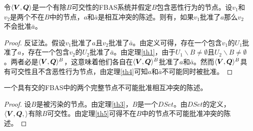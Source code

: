 \begin{theorem}\label{th5}
        令$\langle{\bm V},{\bm Q}\rangle$是一个有除$B${\quorum}可交性的FBAS系统并假定$B$包含恶性行为的节点。设$v_1$和$v_2$是两个不在$B$中的节点，$a$和$\bar a$是相互冲突的陈述。则有，如果$v_1$批准了$a$那么$v_2$不会批准$\bar a$。
\end{theorem}

\begin{proof}
        反证法。假设$v_1$批准了$a$且$v_2$批准了$\bar a$。由定义可得，存在一个包含$v_1$的{\quorum}$U_1$批准了$a$，存在一个包含$v_2$的{\quorum}$U_2$批准了$\bar a$。由定理\ref{th1}，由于$U_1\backslash B\neq \emptyset$且$U_2\backslash B\neq \emptyset$。两者必是$\langle{\bm V},{\bm Q}\rangle^{B}$，这意味着他们各自在$\langle{\bm V},{\bm Q}\rangle^{B}$批准了$a$和$\bar a$。然而$\langle{\bm V},{\bm Q}\rangle^{B}$具有{\quorum}可交性且不含恶性行为节点，由定理\ref{th4}可知$a$和$\bar a$不可能同时被批准。
\end{proof}

\begin{theorem}\label{th6}
        一个具有{\quorum}交的FBAS中的两个完整节点不可能批准相互冲突的陈述。
\end{theorem}

\begin{proof}
        设$B$是被污染的节点。由定理\ref{th3}，$B$是一个$DSet$。由$DSet$的定义，$\langle{\bm V},{\bm Q},\rangle$有除$B${\quorum}可交性。由定理\ref{th5}可得不在$B$中的节点不可能批准冲突的陈述。
\end{proof}
